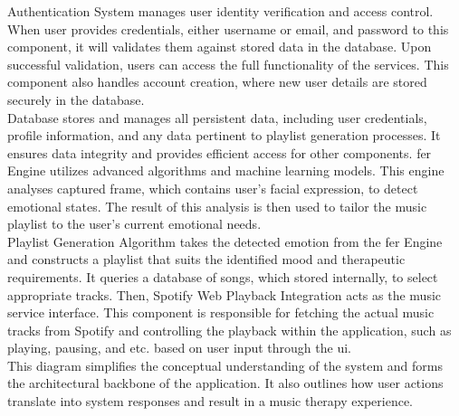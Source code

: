 \indent Authentication System manages user identity verification and access control.
When user provides credentials, either username or email, and password to this component, it will validates them against stored data in the database. 
Upon successful validation, users can access the full functionality of the services.
This component also handles account creation, where new user details are stored securely in the database.
\\
\indent Database stores and manages all persistent data, including user credentials, profile information, and any data pertinent to playlist generation processes.
It ensures data integrity and provides efficient access for other components.
\gls{fer} Engine utilizes advanced algorithms and machine learning models.
This engine analyses captured frame, which contains user's facial expression, to detect emotional states.
The result of this analysis is then used to tailor the music playlist to the user's current emotional needs.
\\
\indent Playlist Generation Algorithm takes the detected emotion from the \gls{fer} Engine and constructs a playlist that suits the identified mood and therapeutic requirements.
It queries a database of songs, which stored internally, to select appropriate tracks.
Then, Spotify Web Playback Integration acts as the music service interface. 
This component is responsible for fetching the actual music tracks from Spotify and controlling the playback within the application, such as playing, pausing, and etc. based on user input through the \gls{ui}.
\\
\indent This diagram simplifies the conceptual understanding of the system and forms the architectural backbone of the application.
It also outlines how user actions translate into system responses and result in a music therapy experience.
\\
